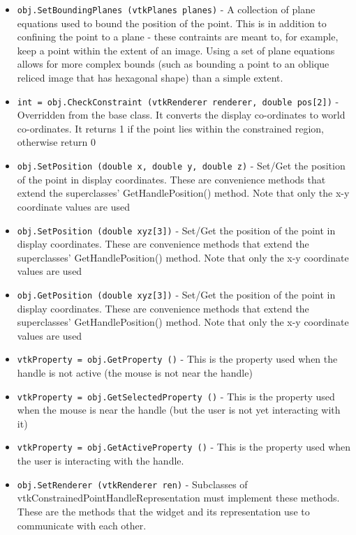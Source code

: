 \begin{itemize}
\item  \verb|obj.SetBoundingPlanes (vtkPlanes planes)| -  A collection of plane equations used to bound the position of the point.
 This is in addition to confining the point to a plane - these contraints
 are meant to, for example, keep a point within the extent of an image.
 Using a set of plane equations allows for more complex bounds (such as
 bounding a point to an oblique reliced image that has hexagonal shape)
 than a simple extent.

\item  \verb|int = obj.CheckConstraint (vtkRenderer renderer, double pos[2])| -  Overridden from the base class. It converts the display
 co-ordinates to world co-ordinates. It returns 1 if the point lies
 within the constrained region, otherwise return 0

\item  \verb|obj.SetPosition (double x, double y, double z)| -  Set/Get the position of the point in display coordinates.  These are
 convenience methods that extend the superclasses' GetHandlePosition()
 method. Note that only the x-y coordinate values are used

\item  \verb|obj.SetPosition (double xyz[3])| -  Set/Get the position of the point in display coordinates.  These are
 convenience methods that extend the superclasses' GetHandlePosition()
 method. Note that only the x-y coordinate values are used

\item  \verb|obj.GetPosition (double xyz[3])| -  Set/Get the position of the point in display coordinates.  These are
 convenience methods that extend the superclasses' GetHandlePosition()
 method. Note that only the x-y coordinate values are used

\item  \verb|vtkProperty = obj.GetProperty ()| -  This is the property used when the handle is not active 
 (the mouse is not near the handle)

\item  \verb|vtkProperty = obj.GetSelectedProperty ()| -  This is the property used when the mouse is near the
 handle (but the user is not yet interacting with it)

\item  \verb|vtkProperty = obj.GetActiveProperty ()| -  This is the property used when the user is interacting
 with the handle.

\item  \verb|obj.SetRenderer (vtkRenderer ren)| -  Subclasses of vtkConstrainedPointHandleRepresentation must implement these methods. These
 are the methods that the widget and its representation use to
 communicate with each other.


\end{itemize}
